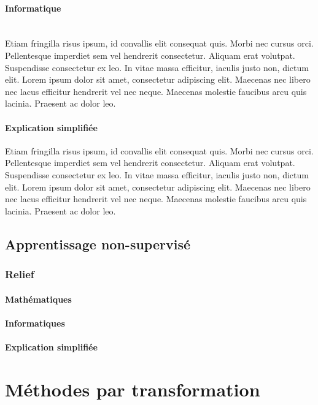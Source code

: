 \documentclass[12pt]{article}
\begin{document}
\paragraph{Informatique}\mbox{}\\
 Etiam fringilla risus ipsum, id convallis elit consequat quis. Morbi nec cursus orci. Pellentesque imperdiet sem vel hendrerit consectetur. Aliquam erat volutpat. Suspendisse consectetur ex leo. In vitae massa efficitur, iaculis justo non, dictum elit. Lorem ipsum dolor sit amet, consectetur adipiscing elit. Maecenas nec libero nec lacus efficitur hendrerit vel nec neque. Maecenas molestie faucibus arcu quis lacinia. Praesent ac dolor leo. 
\paragraph{Explication simplifiée}
 Etiam fringilla risus ipsum, id convallis elit consequat quis. Morbi nec cursus orci. Pellentesque imperdiet sem vel hendrerit consectetur. Aliquam erat volutpat. Suspendisse consectetur ex leo. In vitae massa efficitur, iaculis justo non, dictum elit. Lorem ipsum dolor sit amet, consectetur adipiscing elit. Maecenas nec libero nec lacus efficitur hendrerit vel nec neque. Maecenas molestie faucibus arcu quis lacinia. Praesent ac dolor leo. 

\subsection{Apprentissage non-supervisé}

\subsubsection{Relief}

\paragraph{Mathématiques}
\paragraph{Informatiques}
\paragraph{Explication simplifiée}


\section{Méthodes par transformation}
\end{document}
